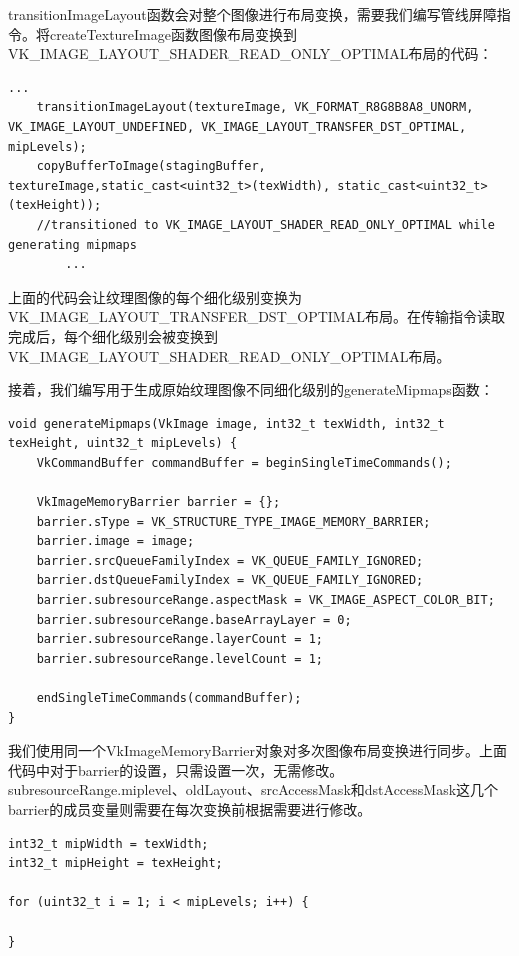 \documentclass{ctexart}
\begin{document}
transitionImageLayout函数会对整个图像进行布局变换，需要我们编写管线屏障指令。将createTextureImage函数图像布局变换到VK\_IMAGE\_LAYOUT\_SHADER\_READ\_ONLY\_OPTIMAL布局的代码：

\begin{lstlisting}[language={[ANSI]C}]
		...
	transitionImageLayout(textureImage, VK_FORMAT_R8G8B8A8_UNORM, VK_IMAGE_LAYOUT_UNDEFINED, VK_IMAGE_LAYOUT_TRANSFER_DST_OPTIMAL, mipLevels);
	copyBufferToImage(stagingBuffer, textureImage,static_cast<uint32_t>(texWidth), static_cast<uint32_t>(texHeight));
	//transitioned to VK_IMAGE_LAYOUT_SHADER_READ_ONLY_OPTIMAL while generating mipmaps
		...
\end{lstlisting}

上面的代码会让纹理图像的每个细化级别变换为VK\_IMAGE\_LAYOUT\_TRANSFER\_DST\_OPTIMAL布局。在传输指令读取完成后，每个细化级别会被变换到VK\_IMAGE\_LAYOUT\_SHADER\_READ\_ONLY\_OPTIMAL布局。

接着，我们编写用于生成原始纹理图像不同细化级别的generateMipmaps函数：

\begin{lstlisting}[language={[ANSI]C}]
void generateMipmaps(VkImage image, int32_t texWidth, int32_t texHeight, uint32_t mipLevels) {
	VkCommandBuffer commandBuffer = beginSingleTimeCommands();

	VkImageMemoryBarrier barrier = {};
	barrier.sType = VK_STRUCTURE_TYPE_IMAGE_MEMORY_BARRIER;
	barrier.image = image;
	barrier.srcQueueFamilyIndex = VK_QUEUE_FAMILY_IGNORED;
	barrier.dstQueueFamilyIndex = VK_QUEUE_FAMILY_IGNORED;
	barrier.subresourceRange.aspectMask = VK_IMAGE_ASPECT_COLOR_BIT;
	barrier.subresourceRange.baseArrayLayer = 0;
	barrier.subresourceRange.layerCount = 1;
	barrier.subresourceRange.levelCount = 1;

	endSingleTimeCommands(commandBuffer);
}
\end{lstlisting}

我们使用同一个VkImageMemoryBarrier对象对多次图像布局变换进行同步。上面代码中对于barrier的设置，只需设置一次，无需修改。subresourceRange.miplevel、oldLayout、srcAccessMask和dstAccessMask这几个barrier的成员变量则需要在每次变换前根据需要进行修改。

\begin{lstlisting}[language={[ANSI]C}]
int32_t mipWidth = texWidth;
int32_t mipHeight = texHeight;

for (uint32_t i = 1; i < mipLevels; i++) {

}
\end{lstlisting}
\end{document}
